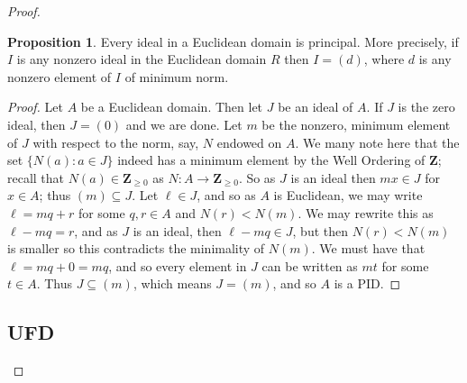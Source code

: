 \documentclass[9pt,reqno]{amsart}
\theoremstyle{definition}
\newtheorem{prop}{Proposition}[section]
\newcommand{\zz}{\mathbf Z}
\begin{document}
\begin{proof}
\begin{prop}
Every ideal in a Euclidean domain is principal. More precisely, if $I$ is any nonzero ideal in the Euclidean domain $R$ then $I = (d)$, where $d$ is any nonzero element of $I$ of minimum norm. 	
\end{prop}
\begin{proof}
	Let $A$ be a Euclidean domain. Then let $J$ be an ideal of $A$. If $J$ is the zero ideal, then $J = (0)$ and we are done. Let $m$ be the nonzero, minimum element of $J$ with respect to the norm, say, $N$ endowed on $A$. We many note here that the set $\{N (a) \colon a \in J \}$ indeed has a minimum element by the Well Ordering of $\zz$; recall that $N(a) \in \zz_{\geq 0}$ as $N \colon A \to \zz_{\geq 0}$. So as $J$ is an ideal then $mx \in J$ for $x \in A$; thus $(m) \subseteq J$. Let $\ell \in J$, and so as $A$ is Euclidean, we may write $\ell = mq + r$ for some $q, r \in A$ and $N(r) < N(m)$. We may rewrite this as $\ell - mq = r$, and as $J$ is an ideal, then $\ell - mq \in J$, but then $N(r) < N(m)$ is smaller so this contradicts the minimality of $N(m)$. We must have that $\ell = mq + 0 = mq$, and so every element in $J$ can be written as $mt$ for some $t \in A$. Thus $J \subseteq (m)$, which means $J = (m)$, and so $A$ is a PID. 
\end{proof}




\subsection{UFD}



\end{proof}
\end{document}
